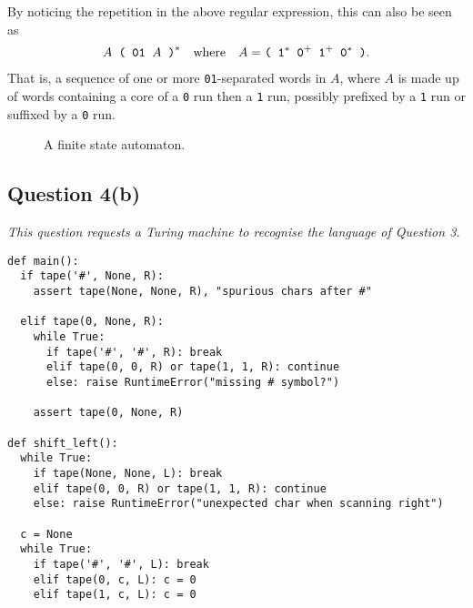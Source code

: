 \documentclass[a4paper]{article}
\begin{document}
By noticing the repetition in the above regular expression, this can also be seen as
\begin{align*}
  A\texttt{ ( 01 $A$ )}^*
  \textrm{\quad{}where\quad{}}A = \texttt{( 1$^*$ 0$^+$ 1$^+$ 0$^*$ )}.
\end{align*}
That is, a sequence of one or more \texttt{01}-separated
words in $A$, where $A$ is made up of
words containing a core of a \texttt 0 run then a \texttt 1 run, possibly prefixed by a \texttt 1 run or suffixed by a \texttt 0 run.


\begin{figure}
  \begin{center}

  \end{center}
  \caption{A finite state automaton.}\label{fig:4a}
\end{figure}



\subsection*{Question 4(b)}
\begin{center}
  \textit{
    This question requests a Turing machine to recognise the language of Question 3.
  }
\end{center}

\newpage
\begin{verbatim}
def main():
  if tape('#', None, R):
    assert tape(None, None, R), "spurious chars after #"

  elif tape(0, None, R):
    while True:
      if tape('#', '#', R): break
      elif tape(0, 0, R) or tape(1, 1, R): continue
      else: raise RuntimeError("missing # symbol?")

    assert tape(0, None, R)

def shift_left():
  while True:
    if tape(None, None, L): break
    elif tape(0, 0, R) or tape(1, 1, R): continue
    else: raise RuntimeError("unexpected char when scanning right")

  c = None
  while True:
    if tape('#', '#', L): break
    elif tape(0, c, L): c = 0
    elif tape(1, c, L): c = 0
  
\end{verbatim}
\end{document}

